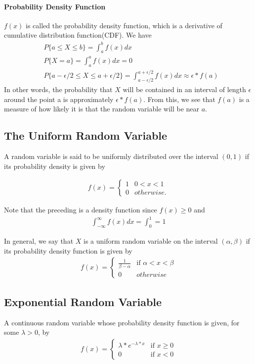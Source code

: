 \documentclass[10 pt,final]{article}
\newcommand{\impo}[1]{{\color{magenta} #1}}
\begin{document}
\paragraph{Probability Density Function} $f(x)$ is called the probability density function, which is a derivative of cumulative distribution function(CDF). We have
\begin{align*}
& P\{a \leq X \leq b\} = \int_{a}^{b} f(x)dx \\
& P\{X=a\} = \int_a^a f(x)dx = 0 \\
& P\{a -\epsilon/2 \leq X \leq a+\epsilon/2\} = \int_{a-\epsilon/2}^{a+\epsilon/2} f(x)dx \approx \epsilon*f(a)
\end{align*}
In other words, the probability that \impo{$X$ will be contained in an interval of length $\epsilon$} around the point a is approximately $\epsilon *f(a)$. From this, we see that \impo{ $f(a)$ is a measure of how likely it is that the random variable will be near $a$}.


\subsection{The Uniform Random Variable}
A random variable is said to be \impo{uniformly distributed} over the interval $(0,1)$ if its probability density is given by

\begin{align*}
f(x) =
\begin{cases}
1 &0 < x < 1\\ 
0 &otherwise.
\end{cases}
\end{align*}

Note that the preceding is a density function since $f(x) \geq 0$ and
\begin{align*}
\int_{-\infty}^{\infty} f(x)dx = \int_0^1 = 1
\end{align*}

In general, we say that $X$ is a uniform random variable on the interval $(\alpha, \beta)$ if its probability density function is given by
\begin{align*}
f(x) =
\begin{cases}
\frac{1}{\beta - \alpha} & \mbox{if } \alpha < x < \beta \\
0 & otherwise
\end{cases}
\end{align*}


\subsection{Exponential Random Variable}
A continuous random variable whose probability density function is given, for some $\lambda > 0$, by
\begin{align*}
f(x) =
\begin{cases}
\lambda * e^{-\lambda*x} & \mbox{if } x \ge 0 \\
0 & \mbox{if } x <0
\end{cases}
\end{align*}
\end{document}
